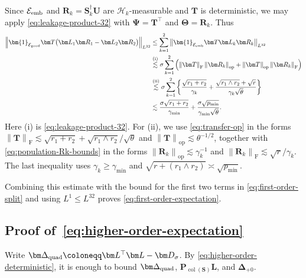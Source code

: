 \documentclass[11pt]{article}
\newcommand{\ind}{\bm{1}}
\newcommand{\trans}{\top}
\DeclareMathOperator{\col}{col}
\newcommand{\opn}[1]{\left\lVert #1\right\rVert_{\mathrm{op}}}
\newcommand{\frn}[1]{\left\lVert #1\right\rVert_{\mathrm{F}}}
\newcommand{\Lqn}[2]{\left\lVert #1\right\rVert_{L^{#2}}}
\newcommand{\cE}{\mathcal{E}}
\newcommand{\Hc}{\mathcal{H}}
\newcommand{\gmin}{\gamma_{\min}}
\begin{document}
Since $\cE_{\rm emb}$ and $\bm R_k=\bm S_k^\dagger\bm U$ are
$\Hc_k$-measurable and $\bm T$ is deterministic, we may apply
\cref{eq:leakage-product-32} with
$\bm\Psi=\bm T^\trans$ and $\bm\Theta=\bm R_k$. Thus
\[
\begin{aligned}
  \Lqn{
    \ind_{\cE_{\rm good}}
    \bm T
    \bigl(
      \bm L_1\bm R_1-\bm L_2\bm R_2
    \bigr)
  }{32}
  &\le
  \sum_{k=1}^2
  \Lqn{
    \ind_{\cE_{\rm emb}}
    \bm T\bm L_k\bm R_k
  }{32} \\
  &\overset{\mathrm{(i)}}{\lesssim}
  \sigma\sum_{k=1}^2
  \left(
    \frn{\bm T}\opn{\bm R_k}
    +
    \opn{\bm T}\frn{\bm R_k}
  \right) \\
  &\overset{\mathrm{(ii)}}{\lesssim}
  \sigma\sum_{k=1}^2
  \left\{
    \frac{\sqrt{r_1+r_2}}{\gamma_k}
    +
    \frac{\sqrt{r_1\wedge r_2}+\sqrt r}
         {\gamma_k\sqrt\theta}
  \right\} \\
  &\lesssim
  \frac{\sigma\sqrt{r_1+r_2}}{\gmin}
  +
  \frac{\sigma\sqrt{p_{\min}}}{\gmin\sqrt\theta}.
\end{aligned}
\]
Here (i) is \cref{eq:leakage-product-32}. For (ii), we use
\cref{eq:transfer-op} in the forms
$\frn{\bm T}\lesssim
\sqrt{r_1+r_2}+\sqrt{r_1\wedge r_2}/\sqrt\theta$ and
$\opn{\bm T}\lesssim\theta^{-1/2}$, together with
\cref{eq:population-Rk-bounds} in the forms
$\opn{\bm R_k}\lesssim\gamma_k^{-1}$ and
$\frn{\bm R_k}\lesssim\sqrt r/\gamma_k$.
The last inequality uses $\gamma_k\ge\gmin$ and
$\sqrt{r+ (r_1\wedge r_2)}\asymp\sqrt{p_{\min}}$.

Combining this estimate with the bound for the first two terms in
\cref{eq:first-order-split} and using $L^1\le L^{32}$ proves
\cref{eq:first-order-expectation}.



\subsection{Proof of~\cref{eq:higher-order-expectation}}
\label{app:higher-order-error}

Write
$\bm\Delta_{\rm quad}\coloneqq\bm L^\trans\bm L-\bm D_\sigma$.
By \cref{eq:higher-order-deterministic}, it is enough to bound
$\bm\Delta_{\rm quad}$, $\bm P_{\col(\bm S)}\bm L$, and
$\bm\Delta_{+0}$.
\end{document}
